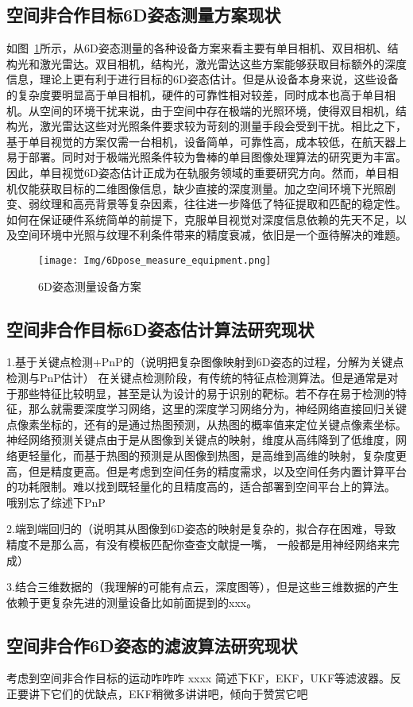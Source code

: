 \subsection{空间非合作目标6D姿态测量方案现状}
如图~\ref{fig:6D_equip}所示，从6D姿态测量的各种设备方案来看主要有单目相机\cite{PAULY2023339, 9802504,Zhang_2024_CVPR,Liu_2024_CVPR}、双目相机\cite{GXXB202106018, zhang2017optimization,Fan2024}、结构光\cite{laser_stereo,hu2023non,sun2022relative}和激光雷达\cite{10801205,10823741}。双目相机，结构光，激光雷达这些方案能够获取目标额外的深度信息，理论上更有利于进行目标的6D姿态估计。但是从设备本身来说，这些设备的复杂度要明显高于单目相机，硬件的可靠性相对较差，同时成本也高于单目相机。从空间的环境干扰来说，由于空间中存在极端的光照环境，使得双目相机，结构光，激光雷达这些对光照条件要求较为苛刻的测量手段会受到干扰\cite{rs15092286,tian2023all}。相比之下，基于单目视觉的方案仅需一台相机，设备简单，可靠性高，成本较低，在航天器上易于部署。同时对于极端光照条件较为鲁棒的单目图像处理算法的研究更为丰富。因此，单目视觉6D姿态估计正成为在轨服务领域的重要研究方向。然而，单目相机仅能获取目标的二维图像信息，缺少直接的深度测量。加之空间环境下光照剧变、弱纹理和高亮背景等复杂因素，往往进一步降低了特征提取和匹配的稳定性\cite{Hu_2021_CVPR,wang2022revisiting}。如何在保证硬件系统简单的前提下，克服单目视觉对深度信息依赖的先天不足，以及空间环境中光照与纹理不利条件带来的精度衰减，依旧是一个亟待解决的难题。
\begin{figure}[htbp]
	\centering
	\texttt{[image: Img/6Dpose\_measure\_equipment.png]}
	\caption{6D姿态测量设备方案}
	\label{fig:6D_equip}
\end{figure}

\subsection{空间非合作目标6D姿态估计算法研究现状}





1.基于关键点检测+PnP的（说明把复杂图像映射到6D姿态的过程，分解为关键点检测与PnP估计）
在关键点检测阶段，有传统的特征点检测算法。但是通常是对于那些特征比较明显，甚至是认为设计的易于识别的靶标。若不存在易于检测的特征，那么就需要深度学习网络，这里的深度学习网络分为，神经网络直接回归关键点像素坐标的，还有的是通过热图预测，从热图的概率值来定位关键点像素坐标。神经网络预测关键点由于是从图像到关键点的映射，维度从高纬降到了低维度，网络更轻量化，而基于热图的预测是从图像到热图，是高维到高维的映射，复杂度更高，但是精度更高。但是考虑到空间任务的精度需求，以及空间任务内置计算平台的功耗限制。难以找到既轻量化的且精度高的，适合部署到空间平台上的算法。 哦别忘了综述下PnP



2.端到端回归的（说明其从图像到6D姿态的映射是复杂的，拟合存在困难，导致精度不是那么高，有没有模板匹配你查查文献提一嘴， 一般都是用神经网络来完成）

3.结合三维数据的（我理解的可能有点云，深度图等），但是这些三维数据的产生依赖于更复杂先进的测量设备比如前面提到的xxx。



\subsection{空间非合作6D姿态的滤波算法研究现状}

考虑到空间非合作目标的运动咋咋咋
xxxx
简述下KF，EKF，UKF等滤波器。反正要讲下它们的优缺点，EKF稍微多讲讲吧，倾向于赞赏它吧
